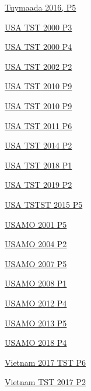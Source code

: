 \hyperref  [problem:Tuymaada 2016, P5]{Tuymaada 2016, P5}

\hyperref  [problem:USA TST 2000 P3]{USA TST 2000 P3}

\hyperref  [problem:USA TST 2000 P4]{USA TST 2000 P4}

\hyperref  [problem:USA TST 2002 P2]{USA TST 2002 P2}

\hyperref  [problem:USA TST 2010 P9]{USA TST 2010 P9}

\hyperref  [problem:USA TST 2010 P9]{USA TST 2010 P9}

\hyperref  [problem:USA TST 2011 P6]{USA TST 2011 P6}

\hyperref  [problem:USA TST 2014 P2]{USA TST 2014 P2}

\hyperref  [problem:USA TST 2018 P1]{USA TST 2018 P1}

\hyperref  [problem:USA TST 2019 P2]{USA TST 2019 P2}

\hyperref  [problem:USA TSTST 2015 P5]{USA TSTST 2015 P5}

\hyperref  [problem:USAMO 2001 P5]{USAMO 2001 P5}

\hyperref  [problem:USAMO 2004 P2]{USAMO 2004 P2}

\hyperref  [problem:USAMO 2007 P5]{USAMO 2007 P5}

\hyperref  [problem:USAMO 2008 P1]{USAMO 2008 P1}

\hyperref  [problem:USAMO 2012 P4]{USAMO 2012 P4}

\hyperref  [problem:USAMO 2013 P5]{USAMO 2013 P5}

\hyperref  [problem:USAMO 2018 P4]{USAMO 2018 P4}

\hyperref  [problem:Vietnam 2017 TST P6]{Vietnam 2017 TST P6}

\hyperref  [problem:Vietnam TST 2017 P2]{Vietnam TST 2017 P2}


